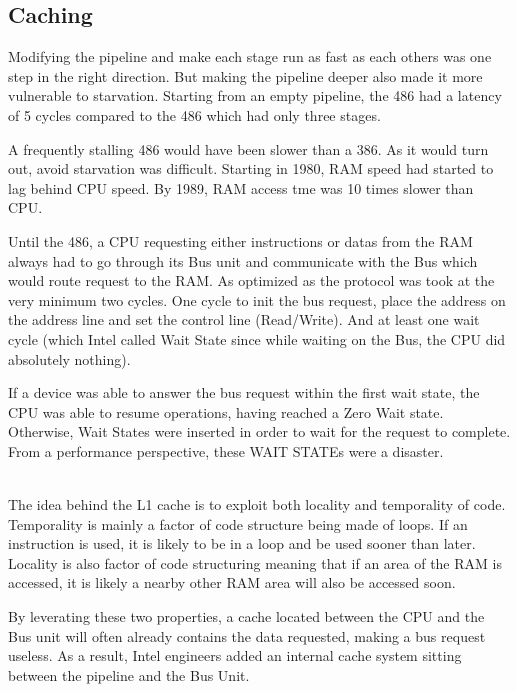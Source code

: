 \subsection{Caching }
Modifying the pipeline and make each stage run as fast as each others was one step in the right direction. But making the pipeline deeper also made it more vulnerable to starvation. Starting from an empty pipeline, the 486 had a latency of 5 cycles compared to the 486 which had only three stages.\\
\par
 A frequently stalling 486 would have been slower than a 386. As it would turn out, avoid starvation was difficult. Starting in 1980, RAM speed had started to lag behind CPU speed. By 1989, RAM access tme was 10 times slower than CPU.\\
\par
{}
\par
Until the 486, a CPU requesting either instructions or datas from the RAM always had to go through its Bus unit and communicate with the Bus which would route request to the RAM. As optimized as the protocol was took at the very minimum two cycles. One cycle to init the bus request, place the address on the address line and set the control line (Read/Write). And at least one wait cycle (which Intel called Wait State since while waiting on the Bus, the CPU did absolutely nothing).\\
\par
{}
\par
If a device was able to answer the bus request within the first wait state, the CPU was able to resume operations, having reached a Zero Wait state. Otherwise, Wait States were inserted in order to wait for the request to complete. From a performance perspective, these WAIT STATEs were a disaster.\\\\
\par
{}
The idea behind the L1 cache is to exploit both locality and temporality of code. Temporality is mainly a factor of code structure being made of loops. If an instruction is used, it is likely to be in a loop and be used sooner than later. Locality is also  factor of code structuring meaning that if an area of the RAM is accessed, it is likely a nearby other RAM area will also be accessed soon.\\
\par
By leverating these two properties, a cache located between the CPU and the Bus unit will often already contains the data requested, making a bus request useless. As a result, Intel engineers added an internal cache system sitting between the pipeline and the Bus Unit.\\
\par
{}




